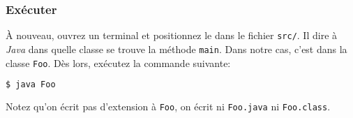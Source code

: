 \subsubsection{Exécuter}
À nouveau, ouvrez un terminal et positionnez le dans le fichier \verb|src/|.
Il dire à {\em Java} dans quelle classe se trouve la méthode \verb|main|.
Dans notre cas, c'est dans la classe \verb|Foo|.
Dès lors, exécutez la commande suivante:
\begin{lstlisting}[language={sh}, morekeywords={java}]
$ java Foo
\end{lstlisting}
Notez qu'on écrit pas d'extension à \verb|Foo|, on écrit ni \verb|Foo.java|
ni \verb|Foo.class|.


